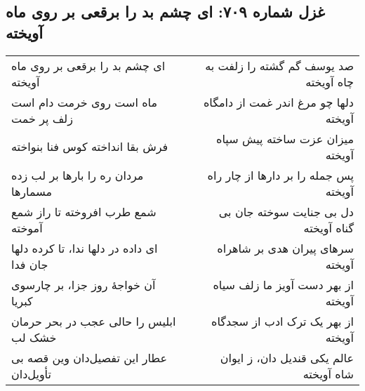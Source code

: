 \begin{center}
\section*{غزل شماره ۷۰۹: ای چشم بد را برقعی بر روی ماه آویخته}
\label{sec:709}
\begin{longtable}{l p{0.5cm} r}
ای چشم بد را برقعی بر روی ماه آویخته
&&
صد یوسف گم گشته را زلفت به چاه آویخته
\\
ماه است روی خرمت دام است زلف پر خمت
&&
دلها چو مرغ اندر غمت از دامگاه آویخته
\\
فرش بقا انداخته کوس فنا بنواخته
&&
میزان عزت ساخته پیش سپاه آویخته
\\
مردان ره را بارها بر لب زده مسمارها
&&
پس جمله را بر دارها از چار راه آویخته
\\
شمع طرب افروخته تا راز شمع آموخته
&&
دل بی جنایت سوخته جان بی گناه آویخته
\\
ای داده در دلها ندا، تا کرده دلها جان فدا
&&
سرهای پیران هدی بر شاهراه آویخته
\\
آن خواجهٔ روز جزا، بر چارسوی کبریا
&&
از بهر دست آویز ما زلف سیاه آویخته
\\
ابلیس را حالی عجب در بحر حرمان خشک لب
&&
از بهر یک ترک ادب از سجدگاه آویخته
\\
عطار این تفصیل‌دان وین قصه بی تأویل‌دان
&&
عالم یکی قندیل دان، ز ایوان شاه آویخته
\\
\end{longtable}
\end{center}
